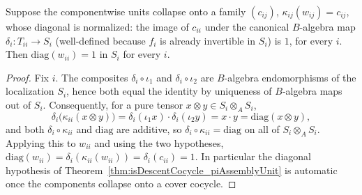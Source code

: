 \begin{theorem}
  \label{thm:diagA_eq_one_of_componentCollapse}
  \leanok
  Suppose the componentwise units collapse onto a family \((c_{ij})\),
  \(\kappa_{ij}(w_{ij}) = c_{ij}\), whose diagonal is normalized: the image of \(c_{ii}\)
  under the canonical \(B\)-algebra map \(\delta_i \colon T_{ii} \to S_i\) (well-defined
  because \(f_i\) is already invertible in \(S_i\)) is \(1\), for every \(i\). Then
  \(\mathrm{diag}(w_{ii}) = 1\) in \(S_i\) for every \(i\).
\end{theorem}
\begin{proof}
  \leanok
  Fix \(i\). The composites \(\delta_i \circ \iota_1\) and \(\delta_i \circ \iota_2\) are
  \(B\)-algebra endomorphisms of the localization \(S_i\), hence both equal the identity by
  uniqueness of \(B\)-algebra maps out of \(S_i\). Consequently, for a pure tensor
  \(x \otimes y \in S_i \otimes_A S_i\),
  \[
    \delta_i\bigl(\kappa_{ii}(x \otimes y)\bigr)
      = \delta_i(\iota_1 x) \cdot \delta_i(\iota_2 y) = x \cdot y
      = \mathrm{diag}(x \otimes y) ,
  \]
  and both \(\delta_i \circ \kappa_{ii}\) and \(\mathrm{diag}\) are additive, so
  \(\delta_i \circ \kappa_{ii} = \mathrm{diag}\) on all of \(S_i \otimes_A S_i\). Applying this
  to \(w_{ii}\) and using the two hypotheses,
  \(\mathrm{diag}(w_{ii}) = \delta_i(\kappa_{ii}(w_{ii})) = \delta_i(c_{ii}) = 1\). In
  particular the diagonal hypothesis of
  Theorem~\ref{thm:isDescentCocycle_piAssemblyUnit} is automatic once the components collapse
  onto a cover cocycle.
\end{proof}

